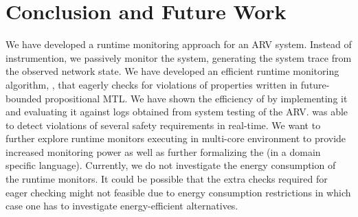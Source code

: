 
\section{Conclusion and Future Work}
We have developed a runtime monitoring approach for an ARV system.
Instead of instrumention, we passively monitor the system, generating the system trace from the observed network state.
We have developed an efficient runtime monitoring algorithm, \monitor, that eagerly checks for violations of properties written
in future-bounded propositional MTL. We have shown the efficiency of \monitor by implementing it and evaluating it against
logs obtained from system testing of the ARV.
\monitor was able to detect violations of several safety requirements in real-time.
We want to further explore runtime monitors executing in multi-core environment to provide increased
monitoring power as well as further formalizing the \sfmap (in a domain specific language).
 Currently, we do not investigate the energy consumption of the runtime monitors.
 It could be possible that the extra checks required for eager checking might not
 feasible due to energy consumption restrictions in which case one has to investigate energy-efficient alternatives.
